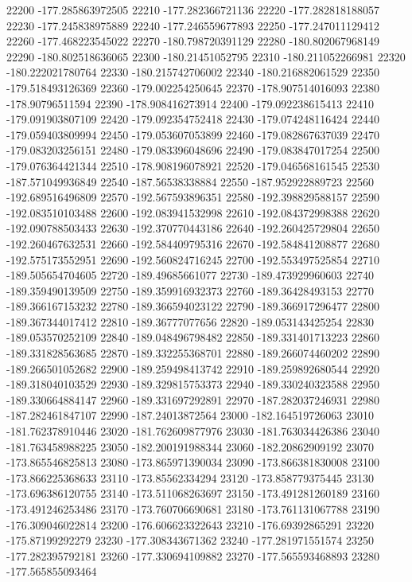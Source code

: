 {22200 -177.285863972505
22210 -177.282366721136
22220 -177.282818188057
22230 -177.245838975889
22240 -177.246559677893
22250 -177.247011129412
22260 -177.468223545022
22270 -180.798720391129
22280 -180.802067968149
22290 -180.802518636065
22300 -180.21451052795
22310 -180.211052266981
22320 -180.222021780764
22330 -180.215742706002
22340 -180.216882061529
22350 -179.518493126369
22360 -179.002254250645
22370 -178.907514016093
22380 -178.90796511594
22390 -178.908416273914
22400 -179.092238615413
22410 -179.091903807109
22420 -179.092354752418
22430 -179.074248116424
22440 -179.059403809994
22450 -179.053607053899
22460 -179.082867637039
22470 -179.083203256151
22480 -179.083396048696
22490 -179.083847017254
22500 -179.076364421344
22510 -178.908196078921
22520 -179.046568161545
22530 -187.571049936849
22540 -187.56538338884
22550 -187.952922889723
22560 -192.689516496809
22570 -192.567593896351
22580 -192.398829588157
22590 -192.083510103488
22600 -192.083941532998
22610 -192.084372998388
22620 -192.090788503433
22630 -192.370770443186
22640 -192.260425729804
22650 -192.260467632531
22660 -192.584409795316
22670 -192.584841208877
22680 -192.575173552951
22690 -192.560824716245
22700 -192.553497525854
22710 -189.505654704605
22720 -189.49685661077
22730 -189.473929960603
22740 -189.359490139509
22750 -189.359916932373
22760 -189.36428493153
22770 -189.366167153232
22780 -189.366594023122
22790 -189.366917296477
22800 -189.367344017412
22810 -189.36777077656
22820 -189.053143425254
22830 -189.053570252109
22840 -189.048496798482
22850 -189.331401713223
22860 -189.331828563685
22870 -189.332255368701
22880 -189.266074460202
22890 -189.266501052682
22900 -189.259498413742
22910 -189.259892680544
22920 -189.318040103529
22930 -189.329815753373
22940 -189.330240323588
22950 -189.330664884147
22960 -189.331697292891
22970 -187.282037246931
22980 -187.282461847107
22990 -187.24013872564
23000 -182.164519726063
23010 -181.762378910446
23020 -181.762609877976
23030 -181.763034426386
23040 -181.763458988225
23050 -182.200191988344
23060 -182.20862909192
23070 -173.865546825813
23080 -173.865971390034
23090 -173.866381830008
23100 -173.866225368633
23110 -173.85562334294
23120 -173.858779375445
23130 -173.696386120755
23140 -173.511068263697
23150 -173.491281260189
23160 -173.491246253486
23170 -173.760706690681
23180 -173.761131067788
23190 -176.309046022814
23200 -176.606623322643
23210 -176.69392865291
23220 -175.87199292279
23230 -177.308343671362
23240 -177.281971551574
23250 -177.282395792181
23260 -177.330694109882
23270 -177.565593468893
23280 -177.565855093464
}
